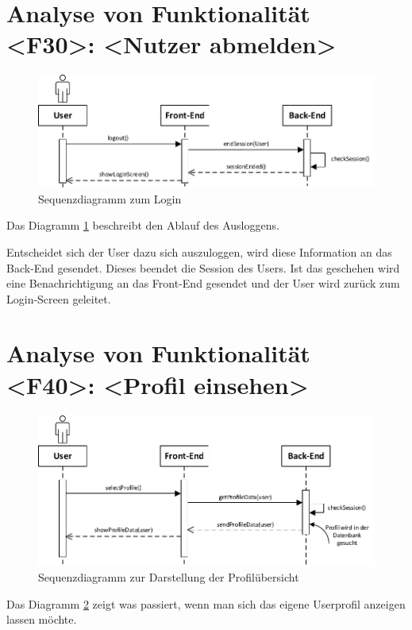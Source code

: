 \section{Analyse von Funktionalität <F30>: <Nutzer abmelden>}
\begin{figure}[h]
\centering
\includegraphics[width=1\textwidth]{figures/sequenz_F30.pdf}
\caption{Sequenzdiagramm zum Login}
\label{sequence_f30}
\end{figure}
Das Diagramm \ref{sequence_f30} beschreibt den Ablauf des Ausloggens.

Entscheidet sich der User dazu sich auszuloggen, wird diese Information an das Back-End gesendet. Dieses beendet die Session des Users. Ist das geschehen wird eine Benachrichtigung an das Front-End gesendet und der User wird zurück zum Login-Screen geleitet.

\newpage
\section{Analyse von Funktionalität <F40>: <Profil einsehen>}
\begin{figure}[h]
\centering
\includegraphics[width=1\textwidth]{figures/sequenz_F40.pdf}
\caption{Sequenzdiagramm zur Darstellung der Profilübersicht}
\label{sequence_f40}
\end{figure}
Das Diagramm  \ref{sequence_f40} zeigt was passiert, wenn man sich das eigene Userprofil anzeigen lassen möchte.


